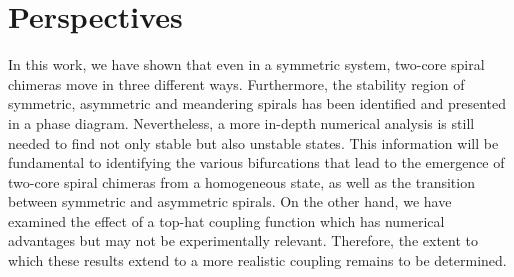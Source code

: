

\section{Perspectives}
 

In this work, we have shown that even in a symmetric system, two-core
spiral chimeras move in three different ways. Furthermore, the stability region of symmetric, 
asymmetric and meandering spirals has been identified and presented in a phase diagram.
Nevertheless, a more in-depth numerical analysis is still needed to find not only
stable but also unstable states. This information will be fundamental to identifying
the various bifurcations that lead to the emergence of two-core spiral chimeras
from a homogeneous state, as well as the transition between symmetric and asymmetric
spirals. On the other hand, we have examined the effect of a top-hat coupling function
which has numerical advantages but may not be experimentally relevant. Therefore,
the extent to which these results extend to a more realistic coupling remains
to be determined.